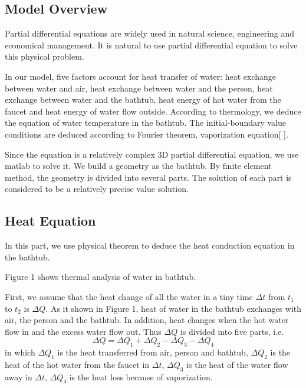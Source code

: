 \documentclass[12pt,a4paper,titlepage]{article}
\begin{document}
\subsection{Model Overview}
\label{sec:model-overview}

Partial differential equations are widely used in natural science, engineering and economical management.
It is natural to use partial differential equation to solve this physical problem.

In our model, five factors account for heat transfer of water: heat exchange between water and air, heat
exchange between water and the person, heat exchange between water and the bathtub, heat energy of hot water from the
faucet and heat energy of water flow outside. According to thermology, we deduce the equation
of water temperature in the bathtub. The initial-boundary value conditions are deduced according to
Fourier theorem, vaporization equation[ ].

Since the equation is a relatively complex 3D partial differential equation, we use matlab to solve it.
We build a geometry as the bathtub. By finite element method, the geometry is divided into several parts.
The solution of each part is considered to be a relatively precise value solution.



\subsection{Heat Equation}
\label{sec:heat equation}

In this part, we use physical theorem to deduce the heat conduction equation
in the bathtub.

Figure 1 shows thermal analysis of water in bathtub.

First, we assume that the heat change of all the water in a tiny time $\Delta t$ from $t_1$ to $t_2$ is $\Delta Q$.
As it shown in Figure 1, heat of water in the bathtub exchanges with air, the person and the bathtub.
In addition, heat changes when the hot water flow in and the excess water flow out.
Thus $\Delta Q$ is divided into five parts, i.e.
\begin{equation}
 \Delta Q=\Delta Q_1+\Delta Q_2-\Delta Q_3-\Delta Q_4
\end{equation}
in which $\Delta Q_1$ is the heat transferred from air, person and bathtub,
$\Delta Q_2$ is the heat of the hot water from the faucet in $\Delta t$,
$\Delta Q_3$ is the heat of the water flow away in $\Delta t$,
$\Delta Q_4$ is the heat loss because of vaporization.
\end{document}
